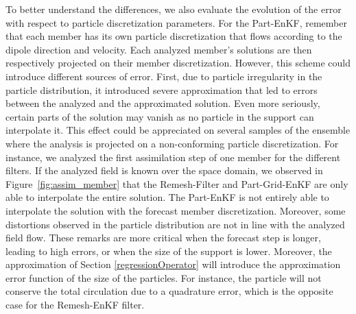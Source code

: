 To better understand the differences, we also evaluate the evolution of the error with respect to particle discretization parameters. For the Part-EnKF, remember that each member has its own particle discretization that flows according to the dipole direction and velocity. Each analyzed member's solutions are then respectively projected on their member discretization. However, this scheme could introduce different sources of error. First, due to particle irregularity in the particle distribution, it introduced severe approximation that led to errors between the analyzed and the approximated solution. Even more seriously, certain parts of the solution may vanish as no particle in the support can interpolate it. This effect could be appreciated on several samples of the ensemble where the analysis is projected on a non-conforming particle discretization. For instance, we analyzed the first assimilation step of one member for the different filters. If the analyzed field is known over the space domain, we observed in Figure~\ref{fig:assim_member} that the Remesh-Filter and Part-Grid-EnKF are only able to interpolate the entire solution. The Part-EnKF is not entirely able to interpolate the solution with the forecast member discretization.
Moreover, some distortions observed in the particle distribution are not in line with the analyzed field flow. These remarks are more critical when the forecast step is longer, leading to high errors, or when the size of the support is lower. Moreover, the approximation of Section \ref{regressionOperator} will introduce the approximation error function of the size of the particles. For instance, the particle will not conserve the total circulation due to a quadrature error, which is the opposite case for the Remesh-EnKF filter.

